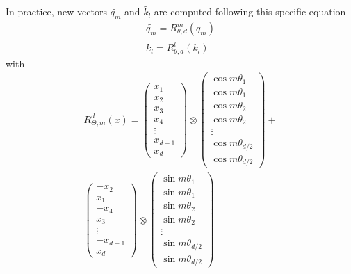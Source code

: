 In practice, new vectors $\tilde{q_m}$ and $\tilde{k_l}$ are computed following this specific equation
\begin{equation}
\begin{split}
\tilde{q_m}=R^m_{\theta,d}(q_m) \\
\tilde{k_l}=R^l_{\theta,d}(k_l)
\end{split}
\end{equation}
with 
\begin{equation}
\begin{multlined}
 R^d_{\Theta, m}(x) = 
	\begin{pmatrix}
		x_1\\
		x_2\\
		x_3\\
		x_4\\
		\vdots\\
		x_{d-1}\\
		x_d
	\end{pmatrix}
	\otimes
	\begin{pmatrix}
		\cos{m\theta_1} \\
		\cos{m\theta_1} \\
		\cos{m\theta_2} \\
		\cos{m\theta_2} \\
		\vdots \\
		\cos{m\theta_{d/2}} \\
		\cos{m\theta_{d/2}} 
	\end{pmatrix}
	+ \\
	\begin{pmatrix}
		-x_2\\
		x_1\\
		-x_4\\
		x_3\\
		\vdots\\
		-x_{d-1}\\
		x_d
	\end{pmatrix}
	\otimes
	\begin{pmatrix}
		\sin{m\theta_1}\\
		\sin{m\theta_1}\\
		\sin{m\theta_2}\\
		\sin{m\theta_2}\\
		\vdots\\
		\sin{m\theta_{d/2}}\\
		\sin{m\theta_{d/2}}
	\end{pmatrix}
 \end{multlined}
 \end{equation} 

